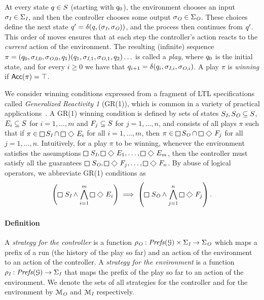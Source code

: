 At every state $q \in S$ (starting with
$q_0$), the environment chooses an input $\sigma_{\textit{I}} \in
\Sigma_{\textit{I}}$, and then the controller chooses some output $\sigma_{\textit{O}}
\in \Sigma_{\textit{O}}$. These choices define the next state $q' =
\delta(q,(\sigma_{\textit{I}}, \sigma_{\textit{O}}))$, and the process then continues from $q'$. This order of moves
ensures that at each step the controller's action reacts to the \emph{current}
action of the environment. The resulting
(infinite) sequence $\pi = (q_0,\sigma_{\textit{I},0},
\sigma_{\textit{O},0}, q_1) (q_1,\sigma_{\textit{I},1},
\sigma_{\textit{O},1}, q_2) \ldots$ is
called a \emph{play}, where $q_0$ is the initial state, and for every $i \geq 0$ we have that $q_{i+1} = \delta(q_i,\sigma_{\textit{I},i},\sigma_{\textit{O},i})$.  A play $\pi$ is \emph{winning} if $\mathsf{Acc}(\pi) = \top$. 


We consider winning conditions expressed from a fragment of LTL specifications called \emph{Generalized Reactivity 1} (GR(1)), which is common in a variety of practical applications~\cite{Moarref18,Alonso18,Maoz2015}.
A GR(1) winning condition is defined by sets of states $S_{\textit{I}}, S_{\textit{O}} \subseteq S$, $E_i \subseteq S$ for $i=1,\ldots,m$ and $F_j \subseteq S$ for $j=1,\ldots,n$, and consists of all plays $ \pi$ such that if $\pi \in \LTLglobally S_\inp \cap \LTLglobally\,\LTLfinally\, E_{i}$ for all $i=1,\ldots,m$, then $\pi \in \LTLglobally S_\out \cap \LTLglobally\,\LTLfinally\, F_{j}$ for all $j=1,\ldots,n$. Intuitively, for a play $ \pi$ to be winning, whenever the environment satisfies the assumptions $\LTLglobally\, S_\inp,\LTLglobally\,\LTLfinally\, E_{1},\ldots,\LTLglobally\,\LTLfinally\, E_{m}$, then the controller must satisfy all the guarantees $\LTLglobally\, S_\out,\LTLglobally\,\LTLfinally\, F_{j},\ldots,\LTLglobally\,\LTLfinally\, F_{n}$. By abuse of logical operators, we abbreviate GR(1)  conditions as
$$\left(\LTLglobally\, S_\inp \wedge \bigwedge_{i=1}^{m}  \LTLglobally\,\LTLfinally\, E_{i}\right) \implies
\left(\LTLglobally\, S_\out \wedge \bigwedge_{j=1}^{n} \LTLglobally\,\LTLfinally\,F_{j}\right).$$


\paragraph*{\textbf{Definition}}
%

A \emph{strategy for the controller} is a function $\rho_{\textit{O}}:
\mathit{Prefs}(\mathcal{G}) \times \Sigma_{\textit{I}} \rightarrow
\Sigma_{\textit{O}}$ which maps a prefix of a run (the history of the play so far) and an action of the environment to an action of the controller. 
A \emph{strategy for the environment} is a function $\rho_{\textit{I}}: \mathit{Prefs}(\mathcal{G})\rightarrow \Sigma_{\textit{I}}$ that maps the prefix of the play so far to an action of the environment. We denote the sets of all strategies for the controller and for the environment by $\mathcal{M}_{\textit{O}} $ and $\mathcal{M}_{\textit{I}}$ respectively.

